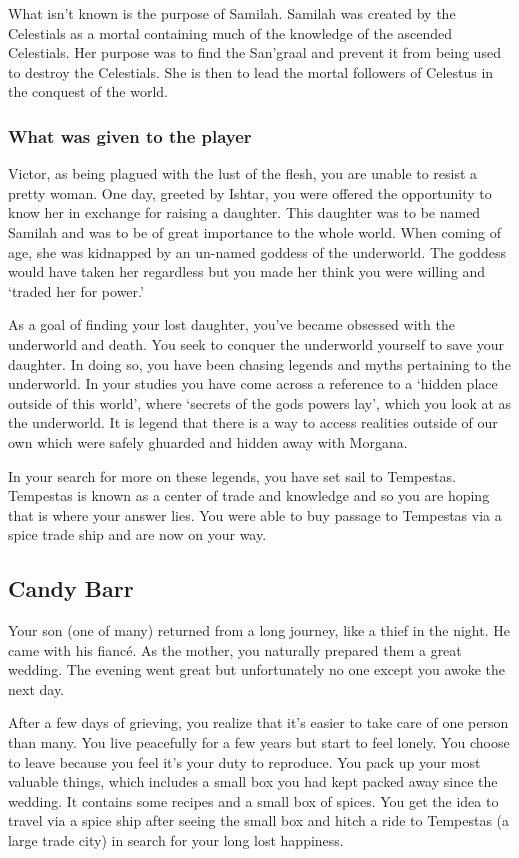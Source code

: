 What isn't known is the purpose of Samilah. Samilah was created by the Celestials as a mortal containing much of the knowledge of the ascended Celestials. Her purpose was to find the San'graal and prevent it from being used to destroy the Celestials. She is then to lead the mortal followers of Celestus in the conquest of the world. 


\subsubsection{What was given to the player}

Victor, as being plagued with the lust of the flesh, you are unable to resist a pretty woman. One day, greeted by Ishtar, you were offered the opportunity to know her in exchange for raising a daughter. This daughter was to be named Samilah and was to be of great importance to the whole world. When coming of age, she was kidnapped by an un-named goddess of the underworld. The goddess would have taken her regardless but you made her think you were willing and `traded her for power.'

As a goal of finding your lost daughter, you've became obsessed with the underworld and death. You seek to conquer the underworld yourself to save your daughter. In doing so, you have been chasing legends and myths pertaining to the underworld. In your studies you have come across a reference to a `hidden place outside of this world', where `secrets of the gods powers lay', which you look at as the underworld. It is legend that there is a way to access realities outside of our own which were safely ghuarded and hidden away with Morgana.

In your search for more on these legends, you have set sail to Tempestas. Tempestas is known as a center of trade and knowledge and so you are hoping that is where your answer lies. You were able to buy passage to Tempestas via a spice trade ship and are now on your way.

\subsection{Candy Barr}

Your son (one of many) returned from a long journey, like a thief in the night. He came with his fianc\'{e}. As the mother, you naturally prepared them a great wedding. The evening went great but unfortunately no one except you awoke the next day.

After a few days of grieving, you realize that it's easier to take care of one person than many. You live peacefully for a few years but start to feel lonely. You choose to leave because you feel it's your duty to reproduce. You pack up your most valuable things, which includes a small box you had kept packed away since the wedding. It contains some recipes and a small box of spices. You get the idea to travel via a spice ship after seeing the small box and hitch a ride to Tempestas (a large trade city) in search for your long lost happiness. 

